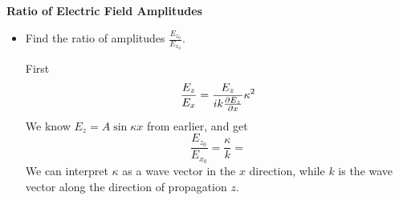 \documentclass[11pt, a4paper]{article}
\renewcommand{\vec}[1]{\bm{#1}} %
\newcommand{\E}{\vec{E}}  %
\begin{document}
\textbf{Ratio of Electric Field Amplitudes}
\begin{itemize}
	\item Find the ratio of amplitudes $ \frac{E_{z_{0}}}{E_{x_{0}}} $.
	
	First
	\begin{equation*}
		\frac{E_{z}}{E_{x}} = \frac{E_{z}}{ik\pdv{E_{z}}{x}} \kappa^{2}
	\end{equation*}
	We know $ E_{z} = A \sin \kappa x $ from earlier, and get
	\begin{equation*}
		\frac{E_{z_{0}}}{E_{x_{0}}} = \frac{\kappa}{k} = 
	\end{equation*}
	We can interpret $ \kappa $ as a wave vector in the $ x $ direction, while $ k $ is the wave vector along the direction of propagation $ z $. 
	
\end{itemize}
\end{document}
